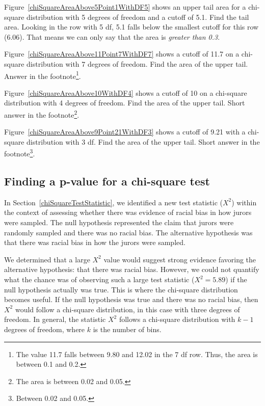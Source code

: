 \begin{example}{Figure~\ref{chiSquareAreaAbove5Point1WithDF5} shows an upper tail area for a chi-square distribution with 5 degrees of freedom and a cutoff of 5.1. Find the tail area.}
Looking in the row with 5 df, 5.1 falls below the smallest cutoff for this row (6.06). That means we can only say that the area is \emph{greater than 0.3}.
\end{example}

\begin{exercise}
Figure~\ref{chiSquareAreaAbove11Point7WithDF7} shows a cutoff of 11.7 on a chi-square distribution with 7 degrees of freedom. Find the area of the upper tail. Answer in the footnote\footnote{The value 11.7 falls between 9.80 and 12.02 in the 7 df row. Thus, the area is between 0.1 and 0.2.}.
\end{exercise}

\begin{exercise}
Figure~\ref{chiSquareAreaAbove10WithDF4} shows a cutoff of 10 on a chi-square distribution with 4 degrees of freedom. Find the area of the upper tail. Short answer in the footnote\footnote{The area is between 0.02 and 0.05.}.
\end{exercise}

\begin{exercise}
Figure~\ref{chiSquareAreaAbove9Point21WithDF3} shows a cutoff of 9.21 with a chi-square distribution with 3 df. Find the area of the upper tail. Short answer in the footnote\footnote{Between 0.02 and 0.05.}.
\end{exercise}



\subsection{Finding a p-value for a chi-square test}
\label{pValueForAChiSquareTest}

In Section~\ref{chiSquareTestStatistic}, we identified a new test statistic ($X^2$) within the context of assessing whether there was evidence of racial bias in how jurors were sampled. The null hypothesis represented the claim that jurors were randomly sampled and there was no racial bias. The alternative hypothesis was that there was racial bias in how the jurors were sampled.

We determined that a large $X^2$ value would suggest strong evidence favoring the alternative hypothesis: that there was racial bias. However, we could not quantify what the chance was of observing such a large test statistic ($X^2=5.89$) if the null hypothesis actually was true. This is where the chi-square distribution becomes useful. If the null hypothesis was true and there was no racial bias, then $X^2$ would follow a chi-square distribution, in this case with three degrees of freedom. In general, the statistic $X^2$ follows a chi-square distribution with $k-1$ degrees of freedom, where $k$ is the number of bins.

